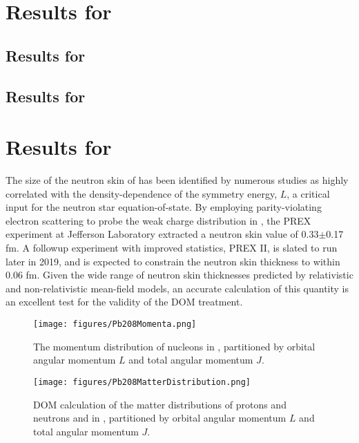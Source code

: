 \section{Results for \snTwelveFour}
\subsection{Results for \snTwelve}
\subsection{Results for \snFour}

\section{Results for \pbEight}
The size of the neutron skin of \pbEight has been identified by numerous studies as highly
correlated with the density-dependence of the symmetry energy, $L$, a critical input for the neutron
star equation-of-state. By employing parity-violating electron scattering to probe the
weak charge distribution in \pbEight, the PREX experiment at Jefferson Laboratory extracted a
\pbEight neutron skin value of 0.33$\pm$0.17 fm. A followup experiment with improved statistics, PREX II,
is slated to run later in 2019, and is expected to constrain the \pbEight neutron skin thickness to
within 0.06 fm. Given the wide range of \pbEight neutron skin thicknesses predicted by relativistic
and non-relativistic mean-field models, an accurate calculation of this quantity is an excellent
test for the validity of the DOM treatment.

\begin{figure}[ht!]
    \centering
    \texttt{[image: figures/Pb208Momenta.png]}
    \caption[The single-particle momentum distributions in \pbEight]
    {
        The momentum distribution of nucleons in \pbEight, partitioned
        by orbital angular momentum $L$ and total angular momentum $J$.
    }
    \label{Ca40Momenta}
\end{figure}

\begin{figure}[ht!]
    \centering
    \texttt{[image: figures/Pb208MatterDistribution.png]}
    \caption[The proton and neutron point distributions in \pbEight]
    {
        DOM calculation of the matter distributions of protons and neutrons and in \pbEight,
        partitioned by orbital angular momentum $L$ and total angular momentum $J$.
    }
    \label{Ca40Momenta}
\end{figure}

